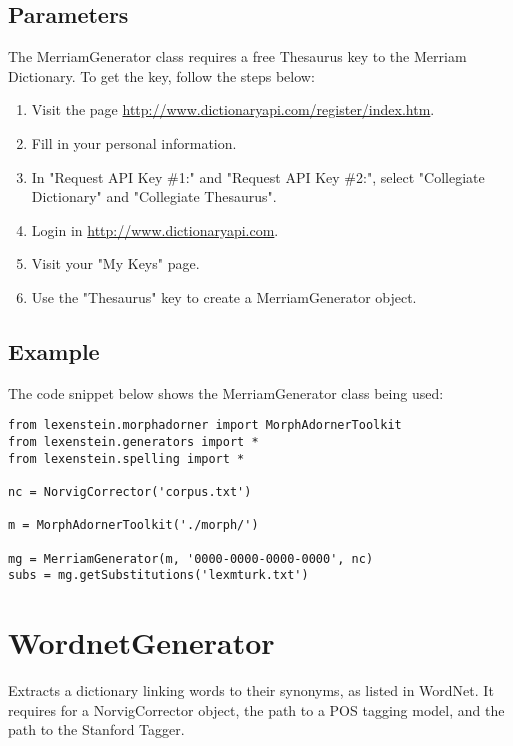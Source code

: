 \subsection{Parameters}

The MerriamGenerator class requires a free Thesaurus key to the Merriam Dictionary. To get the key, follow the steps below:

\begin{enumerate}
\item Visit the page \url{http://www.dictionaryapi.com/register/index.htm}.
\item Fill in your personal information.
\item In "Request API Key \#1:" and "Request API Key \#2:", select "Collegiate Dictionary" and "Collegiate Thesaurus".
\item Login in \url{http://www.dictionaryapi.com}.
\item Visit your "My Keys" page.
\item Use the "Thesaurus" key to create a MerriamGenerator object.
\end{enumerate}

\subsection{Example}

The code snippet below shows the MerriamGenerator class being used:

\begin{lstlisting}
from lexenstein.morphadorner import MorphAdornerToolkit
from lexenstein.generators import *
from lexenstein.spelling import *

nc = NorvigCorrector('corpus.txt')

m = MorphAdornerToolkit('./morph/')

mg = MerriamGenerator(m, '0000-0000-0000-0000', nc)
subs = mg.getSubstitutions('lexmturk.txt')
\end{lstlisting}















\section{WordnetGenerator}

Extracts a dictionary linking words to their synonyms, as listed in WordNet. It requires for a NorvigCorrector object, the path to a POS tagging model, and the path to the Stanford Tagger.

